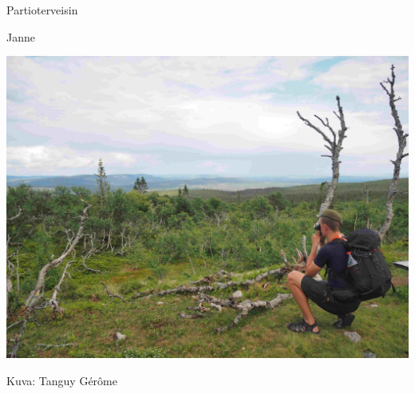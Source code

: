 \begin{multicols}{2}
Partioterveisin

Janne

\medskip

\noindent\includegraphics[width=\linewidth,trim={0 1.5cm 0 4cm},clip]{assets/lpkjtervehdys}

\medskip

\noindent\null\hfill Kuva: Tanguy Gérôme
\end{multicols}
